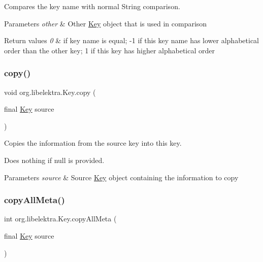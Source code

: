 Compares the key name with normal String comparison.


\begin{DoxyParams}{Parameters}
{\em other} & Other \mbox{\hyperlink{classorg_1_1libelektra_1_1Key}{Key}} object that is used in comparison \\
\hline
\end{DoxyParams}

\begin{DoxyRetVals}{Return values}
{\em 0} & if key name is equal; -\/1 if this key name has lower alphabetical order than the other key; 1 if this key has higher alphabetical order \\
\hline
\end{DoxyRetVals}
\mbox{\label{classorg_1_1libelektra_1_1Key_abe0bb2790e29c52c12fec86a73818626}} 
\subsubsection{\texorpdfstring{copy()}{copy()}}
{\footnotesize\ttfamily void org.\+libelektra.\+Key.\+copy (\begin{DoxyParamCaption}\item[{final \mbox{\hyperlink{classorg_1_1libelektra_1_1Key}{Key}}}]{source }\end{DoxyParamCaption})\hspace{0.3cm}{\ttfamily [inline]}}



Copies the information from the source key into this key. 

Does nothing if null is provided.


\begin{DoxyParams}{Parameters}
{\em source} & Source \mbox{\hyperlink{classorg_1_1libelektra_1_1Key}{Key}} object containing the information to copy \\
\hline
\end{DoxyParams}
\mbox{\label{classorg_1_1libelektra_1_1Key_a9483ae832c9c16e4d68ed1c26babe2ce}} 
\subsubsection{\texorpdfstring{copyAllMeta()}{copyAllMeta()}}
{\footnotesize\ttfamily int org.\+libelektra.\+Key.\+copy\+All\+Meta (\begin{DoxyParamCaption}\item[{final \mbox{\hyperlink{classorg_1_1libelektra_1_1Key}{Key}}}]{source }\end{DoxyParamCaption})\hspace{0.3cm}{\ttfamily [inline]}}



